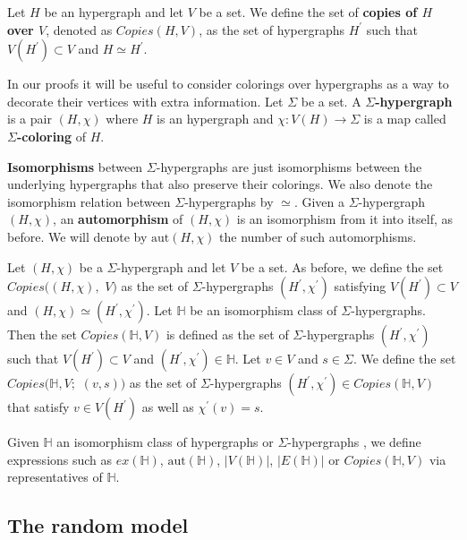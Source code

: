 \documentclass[12pt,notitlepage,a4paper]{article}
\theoremstyle{definition}
\newcommand{\aut}{\mathrm{aut}}
\begin{document}
Let $H$ be an hypergraph and let $V$ be a set. We define the
set of \textbf{copies of $H$ over $V$}, denoted as $Copies(H,V)$, 
as the set of hypergraphs 
$H^\prime$ such that
$V(H^\prime)\subset V$ and $H\simeq H^\prime$.   \par

In our proofs it will be useful to consider colorings over 
hypergraphs as a way to decorate their 
vertices with extra information. 
Let $\Sigma$ be a set. A \textbf{$\Sigma$-hypergraph}
is a pair $(H, \chi)$ where $H$ is an hypergraph
and $\chi: V(H)\rightarrow \Sigma$ is a map 
called \textbf{$\Sigma$-coloring} of $H$. \par
\textbf{Isomorphisms} between $\Sigma$-hypergraphs are just isomorphisms between the underlying
hypergraphs that also preserve their colorings. We also denote the isomorphism relation between 
$\Sigma$-hypergraphs by $\simeq$.
Given a $\Sigma$-hypergraph $(H,\chi)$,  an 
\textbf{automorphism} of $(H,\chi)$ is an 
isomorphism from it into itself, as before. We will denote
by $\aut(H,\chi)$ the number of such automorphisms. 
\par

Let $(H,\chi)$ be a $\Sigma$-hypergraph and let $V$ be a set.
As before, we define the set $Copies\big(
(H,\chi),\, \, V\big)$ as the set of $\Sigma$-hypergraphs
$(H^\prime,\chi^\prime)$ satisfying $V(H^\prime)\subset V$ and
$(H,\chi)\simeq (H^\prime,\chi^\prime)$. Let $\mathbb{H}$ be 
an isomorphism class of $\Sigma$-hypergraphs. Then the set
$Copies(\mathbb{H}, V)$ is defined as the set of $\Sigma$-hypergraphs
$(H^\prime,\chi^\prime)$ such that 
$V(H^\prime)\subset V$ and
$(H^\prime,\chi^\prime)\in \mathbb{H}$. 
Let $v\in V$ and $s\in \Sigma$. We define the
set $Copies\big(\mathbb{H}, V;\,\, (v,s)\big)$ 
as the set of $\Sigma$-hypergraphs
$(H^\prime,\chi^\prime)\in Copies(\mathbb{H}, V)$
that satisfy $v\in V(H^\prime)$ as well as
$\chi^\prime(v)=s$. \par

Given $\mathbb{H}$ an isomorphism class of hypergraphs or $\Sigma$-hypergraphs
, we define expressions
such as $ex(\mathbb{H})$, $\aut(\mathbb{H})$,
$|V(\mathbb{H})|$, $|E(\mathbb{H})|$ or
$Copies(\mathbb{H},V)$ via representatives of $\mathbb{H}$.\par 

\subsection{The random model} \label{sect:random}
\end{document}
